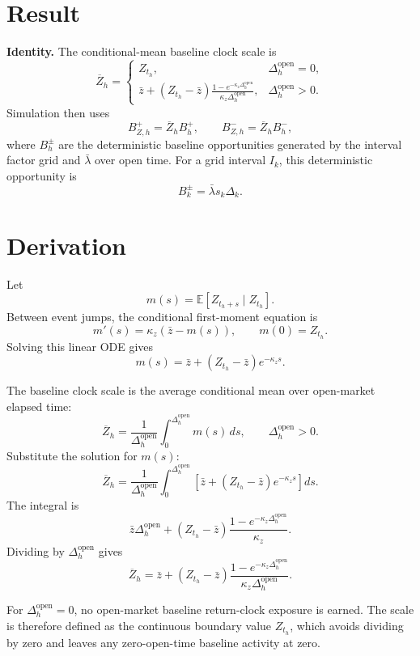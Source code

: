 \documentclass[11pt]{article}
\begin{document}
\section{Result}

\noindent\textbf{Identity.} The conditional-mean baseline clock scale is
\[
    \overline Z_h
    =
    \begin{cases}
        Z_{t_h},
        & \Delta_h^{\mathrm{open}}=0,\\[6pt]
        \displaystyle
        \bar z+
        (Z_{t_h}-\bar z)
        \frac{1-e^{-\kappa_z\Delta_h^{\mathrm{open}}}}
        {\kappa_z\Delta_h^{\mathrm{open}}},
        & \Delta_h^{\mathrm{open}}>0.
    \end{cases}
\]
Simulation then uses
\[
    B_{Z,h}^+
    =
    \overline Z_h B_h^+,
    \qquad
    B_{Z,h}^-
    =
    \overline Z_h B_h^-,
\]
where \(B_h^\pm\) are the deterministic baseline opportunities generated by
the interval factor grid and \(\bar\lambda\) over open time.
For a grid interval \(I_k\), this deterministic opportunity is
\[
    B_k^\pm=\bar\lambda s_k\Delta_k.
\]

\section{Derivation}

Let
\[
    m(s)
    =
    \mathbb E[Z_{t_h+s}\mid Z_{t_h}].
\]
Between event jumps, the conditional first-moment equation is
\[
    m'(s)=\kappa_z(\bar z-m(s)),
    \qquad
    m(0)=Z_{t_h}.
\]
Solving this linear ODE gives
\[
    m(s)=\bar z+(Z_{t_h}-\bar z)e^{-\kappa_z s}.
\]

The baseline clock scale is the average conditional mean over open-market
elapsed time:
\[
    \overline Z_h
    =
    \frac{1}{\Delta_h^{\mathrm{open}}}
    \int_0^{\Delta_h^{\mathrm{open}}}m(s)\,ds,
    \qquad
    \Delta_h^{\mathrm{open}}>0.
\]
Substitute the solution for \(m(s)\):
\[
    \overline Z_h
    =
    \frac{1}{\Delta_h^{\mathrm{open}}}
    \int_0^{\Delta_h^{\mathrm{open}}}
    \left[
        \bar z+(Z_{t_h}-\bar z)e^{-\kappa_z s}
    \right]ds.
\]
The integral is
\[
    \bar z\Delta_h^{\mathrm{open}}
    +
    (Z_{t_h}-\bar z)
    \frac{1-e^{-\kappa_z\Delta_h^{\mathrm{open}}}}{\kappa_z}.
\]
Dividing by \(\Delta_h^{\mathrm{open}}\) gives
\[
    \overline Z_h
    =
    \bar z+
    (Z_{t_h}-\bar z)
    \frac{1-e^{-\kappa_z\Delta_h^{\mathrm{open}}}}
    {\kappa_z\Delta_h^{\mathrm{open}}}.
\]

For \(\Delta_h^{\mathrm{open}}=0\), no open-market baseline return-clock
exposure is earned.
The scale is therefore defined as the continuous boundary value \(Z_{t_h}\),
which avoids dividing by zero and leaves any zero-open-time baseline activity
at zero.
\end{document}

